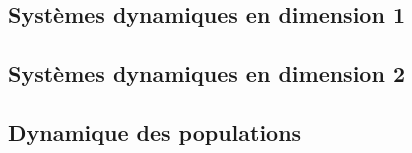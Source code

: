 \documentclass[french, 12pt]{article}
\numberwithin{exercise}{section}
\numberwithin{equation}{section}
\begin{document}
\subsection{Systèmes dynamiques en dimension 1}



\subsection{Systèmes dynamiques en dimension 2}



\subsection{Dynamique des populations}



\end{document}
